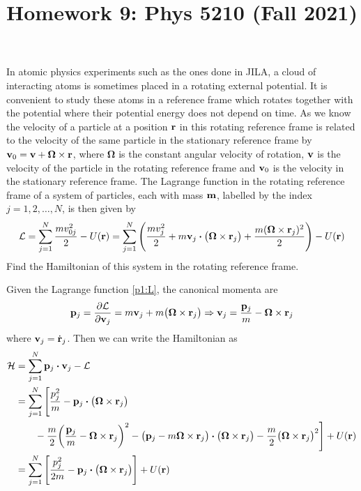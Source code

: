 \documentclass[12pt]{article}
\title{Homework 9: Phys 5210 (Fall 2021)}
\begin{document}
\maketitle
\begin{problem}{1}
In atomic physics experiments such as the ones done in JILA, a cloud of
interacting atoms is sometimes placed in a rotating external potential. It is
convenient to study these atoms in a reference frame which rotates together
with the potential where their potential energy does not depend on time. As we
know the velocity of a particle at a position $\vb{r}$ in this rotating
reference frame is related to the velocity of the same particle in the
stationary reference frame by $\vb{v}_0=\vb{v}+\bm\Omega\times\vb{r}$, where
$\bm\Omega$ is the constant angular velocity of rotation, $\vb{v}$ is the
velocity of the particle in the rotating reference frame and $\vb{v}_0$ is the
velocity in the stationary reference frame. The Lagrange function in the
rotating reference frame of a system of particles, each with mass $\vb{m}$,
labelled by the index $j=1,2,\hdots,N$, is then given by
\begin{equation}\label{p1:L}
    \LL=\sum_{j=1}^N\frac{mv_{0j}^2}{2}-U(\vb{r})
    =\sum_{j=1}^N\qty(\frac{mv_j^2}{2}+m\vb{v}_j\vdot\qty(\bm\Omega\times\vb{r}_j)+\frac{m(\bm\Omega\times\vb{r}_j)^2}{2})-U(\vb{r})
\end{equation}
Find the Hamiltonian of this system in the rotating reference frame.
\begin{solution}
Given the Lagrange function \eqref{p1:L}, the canonical momenta are
\begin{align}
    \vb{p}_j=\frac{\partial\mathcal{L}}{\partial\vb{v}_j}
            =m\vb{v}_j+m\qty(\bm\Omega\times\vb{r}_j)
    \Rightarrow\vb{v}_j=\frac{\vb{p}_j}{m}-\bm\Omega\times\vb{r}_j
\end{align}
where $\vb{v}_j=\dot{\vb{r}}_j$. Then we can write the Hamiltonian as
\begin{align}
    \HH
    &=\sum_{j=1}^N\vb{p}_j\vdot \vb{v}_j-\LL\notag\\
    &=\sum_{j=1}^N\Bigg[
    \frac{p_j^2}{m}-\vb{p}_j\vdot\qty(\bm\Omega\times\vb{r}_j)\notag\\
    &\qquad-\frac{m}{2}\qty(\frac{\vb{p}_j}{m}-\bm\Omega\times\vb{r}_j)^2
    -\qty(\vb{p}_j-m\bm\Omega\times\vb{r}_j)\vdot\qty(\bm\Omega\times\vb{r}_j)
    -\frac{m}{2}\qty(\bm\Omega\times\vb{r}_j)^2
    \Bigg]+U(\vb{r})\notag\\
    &=\sum_{j=1}^N\qty[\frac{p_j^2}{2m}-\vb{p}_j\vdot\qty(\bm\Omega\times\vb{r}_j)]+U(\vb{r})
\end{align}
\end{solution}
\end{problem}
\end{document}
